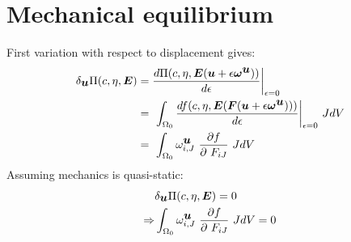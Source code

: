\section{Mechanical equilibrium}
First variation with respect to displacement gives:
\begin{align}
\delta_{\mbox{\boldmath$ u$}}\Pi(c , \eta, \mbox{\boldmath$ E$}) &= \frac{d \Pi(c, \eta, \mbox{\boldmath$ E$}(\mbox{\boldmath$ u$} + \epsilon \mbox{\boldmath$\omega$}^{\mbox{\boldmath$ u$}}))}{d\epsilon} \bigg|_{\epsilon=0} \notag \\
 &= ~\int_{\Omega_0} \frac{d f(c, \eta, \mbox{\boldmath$ E$}(\mbox{\boldmath$ F$}(\mbox{\boldmath$ u$} + \epsilon \mbox{\boldmath$\omega$}^{\mbox{\boldmath$ u$}})))}{d \epsilon} \bigg|_{\epsilon=0} ~J dV \notag \\
 &= ~\int_{\Omega_0} \omega^{\mbox{\boldmath$ u$}}_{i,J} ~\frac{\partial f}{\partial ~F_{iJ}} ~J dV 
\end{align}	
Assuming mechanics is quasi-static:
\begin{align}
& \delta_{\mbox{\boldmath$ u$}}\Pi(c, \eta, \mbox{\boldmath$ E$}) = 0 \notag \\
\Rightarrow & \int_{\Omega_0} \omega^{\mbox{\boldmath$ u$}}_{i,J} ~\frac{\partial f}{\partial ~F_{iJ}} ~J dV = 0 
 \label{governingEquationMechanics}
\end{align}	




